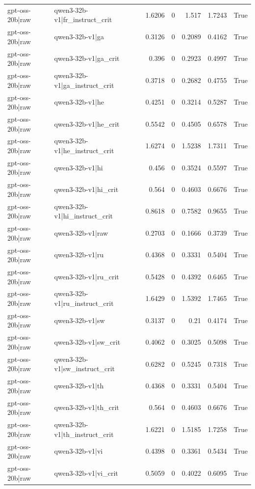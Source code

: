\begin{table}
\begin{tabular}{l l r r r r l}
gpt-oss-20b|raw & qwen3-32b-v1|fr_instruct_crit & 1.6206 & 0 & 1.517 & 1.7243 & True \\
gpt-oss-20b|raw & qwen3-32b-v1|ga & 0.3126 & 0 & 0.2089 & 0.4162 & True \\
gpt-oss-20b|raw & qwen3-32b-v1|ga_crit & 0.396 & 0 & 0.2923 & 0.4997 & True \\
gpt-oss-20b|raw & qwen3-32b-v1|ga_instruct_crit & 0.3718 & 0 & 0.2682 & 0.4755 & True \\
gpt-oss-20b|raw & qwen3-32b-v1|he & 0.4251 & 0 & 0.3214 & 0.5287 & True \\
gpt-oss-20b|raw & qwen3-32b-v1|he_crit & 0.5542 & 0 & 0.4505 & 0.6578 & True \\
gpt-oss-20b|raw & qwen3-32b-v1|he_instruct_crit & 1.6274 & 0 & 1.5238 & 1.7311 & True \\
gpt-oss-20b|raw & qwen3-32b-v1|hi & 0.456 & 0 & 0.3524 & 0.5597 & True \\
gpt-oss-20b|raw & qwen3-32b-v1|hi_crit & 0.564 & 0 & 0.4603 & 0.6676 & True \\
gpt-oss-20b|raw & qwen3-32b-v1|hi_instruct_crit & 0.8618 & 0 & 0.7582 & 0.9655 & True \\
gpt-oss-20b|raw & qwen3-32b-v1|raw & 0.2703 & 0 & 0.1666 & 0.3739 & True \\
gpt-oss-20b|raw & qwen3-32b-v1|ru & 0.4368 & 0 & 0.3331 & 0.5404 & True \\
gpt-oss-20b|raw & qwen3-32b-v1|ru_crit & 0.5428 & 0 & 0.4392 & 0.6465 & True \\
gpt-oss-20b|raw & qwen3-32b-v1|ru_instruct_crit & 1.6429 & 0 & 1.5392 & 1.7465 & True \\
gpt-oss-20b|raw & qwen3-32b-v1|sw & 0.3137 & 0 & 0.21 & 0.4174 & True \\
gpt-oss-20b|raw & qwen3-32b-v1|sw_crit & 0.4062 & 0 & 0.3025 & 0.5098 & True \\
gpt-oss-20b|raw & qwen3-32b-v1|sw_instruct_crit & 0.6282 & 0 & 0.5245 & 0.7318 & True \\
gpt-oss-20b|raw & qwen3-32b-v1|th & 0.4368 & 0 & 0.3331 & 0.5404 & True \\
gpt-oss-20b|raw & qwen3-32b-v1|th_crit & 0.564 & 0 & 0.4603 & 0.6676 & True \\
gpt-oss-20b|raw & qwen3-32b-v1|th_instruct_crit & 1.6221 & 0 & 1.5185 & 1.7258 & True \\
gpt-oss-20b|raw & qwen3-32b-v1|vi & 0.4398 & 0 & 0.3361 & 0.5434 & True \\
gpt-oss-20b|raw & qwen3-32b-v1|vi_crit & 0.5059 & 0 & 0.4022 & 0.6095 & True \\

\end{tabular}
\end{table}
